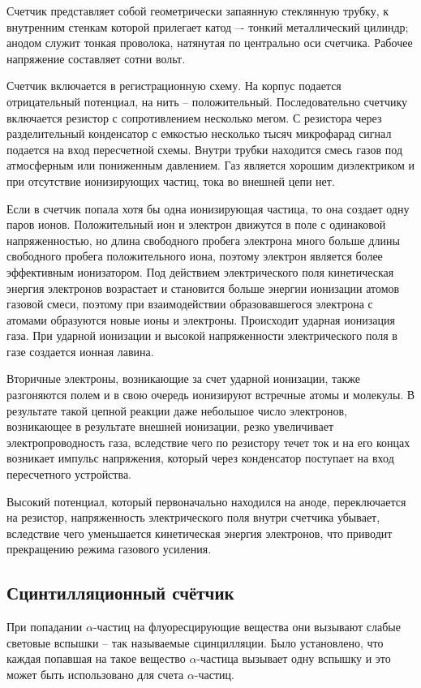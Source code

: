 \documentclass[14pt,pscyr,titlepage]{hedreport}
\begin{document}
 		Счетчик представляет собой геометрически запаянную стеклянную трубку, 
 		к внутренним стенкам которой прилегает катод –- тонкий металлический 
 		цилиндр; анодом служит тонкая проволока, натянутая по центрально оси 
 		счетчика. Рабочее напряжение составляет сотни вольт. 

		Счетчик включается в регистрационную схему. На корпус подается 
		отрицательный потенциал, на нить -- положительный. Последовательно 
		счетчику включается резистор с сопротивлением  несколько мегом. С 
		резистора через разделительный конденсатор с емкостью несколько тысяч 
		микрофарад сигнал подается на вход пересчетной схемы. Внутри трубки 
		находится смесь газов под атмосферным или пониженным давлением. Газ 
		является хорошим диэлектриком и при отсутствие ионизирующих частиц, 
		тока во внешней цепи нет.  

		Если в счетчик попала хотя бы одна ионизирующая частица, то она 
		создает одну паров ионов. Положительный ион и электрон движутся в 
		поле с одинаковой напряженностью, но длина свободного пробега 
		электрона много больше длины свободного пробега положительного иона, 
		поэтому электрон является более эффективным ионизатором. Под действием 
		электрического поля  кинетическая энергия электронов возрастает и 
		становится больше энергии ионизации атомов газовой смеси, поэтому 
		при взаимодействии образовавшегося электрона с атомами  образуются 
		новые ионы и электроны. Происходит ударная ионизация газа. При ударной 
		ионизации и высокой напряженности электрического поля в газе создается 
		ионная лавина.        

		Вторичные электроны, возникающие за счет  ударной ионизации, также 
		разгоняются полем и в свою очередь ионизируют встречные атомы и 
		молекулы. В результате такой цепной реакции даже небольшое число 
		электронов, возникающее в результате внешней ионизации, резко 
		увеличивает электропроводность  газа, вследствие чего по резистору 
		течет ток и на его концах возникает импульс напряжения, который через 
		конденсатор поступает на вход пересчетного устройства.

		Высокий потенциал, который первоначально находился на аноде, 
		переключается на резистор, напряженность электрического поля внутри 
		счетчика убывает, вследствие чего уменьшается кинетическая энергия 
		электронов, что приводит прекращению режима газового усиления.

	\subsection{Сцинтилляционный счётчик}
		При попадании \( \alpha \)-частиц на флуоресцирующие вещества они 
		вызывают слабые световые вспышки -- так называемые сцинцилляции. Было 
		установлено, что каждая попавшая на такое вещество 
		\( \alpha \)-частица вызывает одну вспышку и это может быть 
		использовано для счета \( \alpha \)-частиц.
\end{document}
